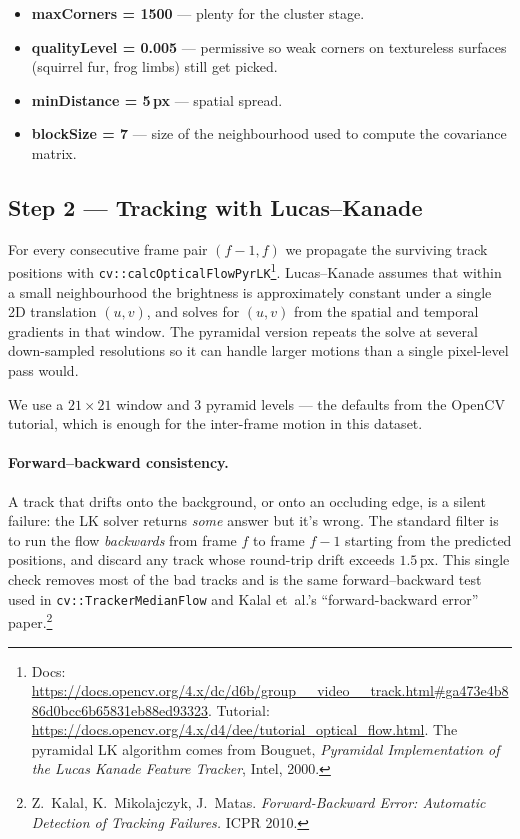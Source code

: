 \documentclass[11pt,a4paper]{article}
\begin{document}
\begin{itemize}\itemsep2pt
\item \textbf{maxCorners = 1500} --- plenty for the cluster stage.
\item \textbf{qualityLevel = 0.005} --- permissive so weak corners on
  textureless surfaces (squirrel fur, frog limbs) still get picked.
\item \textbf{minDistance = 5\,px} --- spatial spread.
\item \textbf{blockSize = 7} --- size of the neighbourhood used to
  compute the covariance matrix.
\end{itemize}

\subsection{Step 2 --- Tracking with Lucas--Kanade}

For every consecutive frame pair $(f-1, f)$ we propagate the
surviving track positions with
\texttt{cv::calcOpticalFlowPyrLK}\footnote{Docs:
\url{https://docs.opencv.org/4.x/dc/d6b/group__video__track.html\#ga473e4b886d0bcc6b65831eb88ed93323}.
Tutorial:
\url{https://docs.opencv.org/4.x/d4/dee/tutorial_optical_flow.html}.
The pyramidal LK algorithm comes from Bouguet, \emph{Pyramidal
Implementation of the Lucas Kanade Feature Tracker}, Intel, 2000.}.
Lucas--Kanade assumes that within a small neighbourhood the
brightness is approximately constant under a single 2D translation
$(u, v)$, and solves for $(u, v)$ from the spatial and temporal
gradients in that window. The pyramidal version repeats the solve at
several down-sampled resolutions so it can handle larger motions
than a single pixel-level pass would.

We use a $21\!\times\!21$ window and $3$ pyramid levels --- the
defaults from the OpenCV tutorial, which is enough for the
inter-frame motion in this dataset.

\paragraph{Forward--backward consistency.} A track that drifts onto
the background, or onto an occluding edge, is a silent failure: the
LK solver returns \emph{some} answer but it's wrong. The standard
filter is to run the flow \emph{backwards} from frame $f$ to
frame $f-1$ starting from the predicted positions, and discard any
track whose round-trip drift exceeds $1.5$\,px. This single check
removes most of the bad tracks and is the same forward--backward
test used in \texttt{cv::TrackerMedianFlow} and Kalal et~al.'s
``forward-backward error'' paper.\footnote{Z.~Kalal, K.~Mikolajczyk,
J.~Matas. \emph{Forward-Backward Error: Automatic Detection of
Tracking Failures.} ICPR 2010.}
\end{document}
